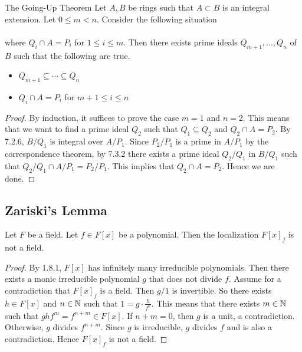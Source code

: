 \documentclass[a4paper]{article}
\begin{document}
\begin{thm}{The Going-Up Theorem}{} Let $A,B$ be rings such that $A\subset B$ is an integral extension. Let $0\leq m<n$. Consider the following situation \\
\\
where $Q_i\cap A=P_i$ for $1\leq i\leq m$. Then there exists prime ideals $Q_{m+1},\dots,Q_n$ of $B$ such that the following are true. 
\begin{itemize}
\item $Q_{m+1}\subseteq\cdots\subseteq Q_n$
\item $Q_i\cap A=P_i$ for $m+1\leq i\leq n$
\end{itemize} 
\begin{proof}
By induction, it suffices to prove the case $m=1$ and $n=2$. This means that we want to find a prime ideal $Q_2$ such that $Q_1\subseteq Q_2$ and $Q_2\cap A=P_2$. By 7.2.6, $B/Q_1$ is integral over $A/P_1$. Since $P_2/P_1$ is a prime in $A/P_1$ by the correspondence theorem, by 7.3.2 there exists a prime ideal $Q_2/Q_1$ in $B/Q_1$ such that $Q_2/Q_1\cap A/P_1=P_2/P_1$. This implies that $Q_2\cap A=P_2$. Hence we are done. 
\end{proof}
\end{thm}

\subsection{Zariski's Lemma}
\begin{lmm}{}{} Let $F$ be a field. Let $f\in F[x]$ be a polynomial. Then the localization $F[x]_f$ is not a field. 
\begin{proof}
By 1.8.1, $F[x]$ has infinitely many irreducible polynomials. Then there exists a monic irreducible polynomial $g$ that does not divide $f$. Assume for a contradiction that $F[x]_f$ is a field. Then $g/1$ is invertible. So there exists $h\in F[x]$ and $n\in\mathbb{N}$ such that $1=g\cdot\frac{h}{f^n}$. This means that there exists $m\in\mathbb{N}$ such that $ghf^m=f^{n+m}\in F[x]$. If $n+m=0$, then $g$ is a unit, a contradiction. Otherwise, $g$ divides $f^{n+m}$. Since $g$ is irreducible, $g$ divides $f$ and is also a contradiction. Hence $F[x]_f$ is not a field. 
\end{proof}
\end{lmm}
\end{document}

